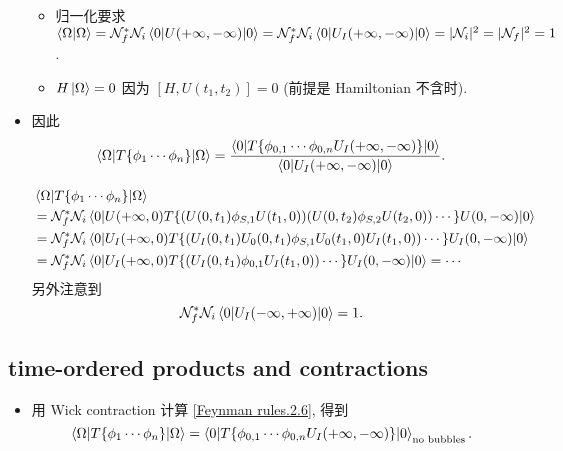 \begin{itemize}
	\begin{itemize}
		\item 归一化要求 $\braket{\Omega | \Omega} = \mathcal{N}^*_f \mathcal{N}_i \braket{0 | U(+ \infty, - \infty) | 0} = \mathcal{N}^*_f \mathcal{N}_i \braket{0 | U_I(+ \infty, - \infty) | 0} = |\mathcal{N}_i|^2 = |\mathcal{N}_f|^2 = 1$.
		
		\item $H \ket{\Omega} = 0$ 因为 $[H, U(t_1, t_2)] = 0$ (前提是 Hamiltonian 不含时).
	\end{itemize}
	
	\item 因此
	\begin{equation} \label{Feynman rules.2.6}
		\braket{\Omega | T\{\phi_1 \cdots \phi_n\} | \Omega} = \frac{\braket{0 | T\{\phi_{0, 1} \cdots \phi_{0, n} U_I(+ \infty, - \infty)\} | 0}}{\braket{0 | U_I(+ \infty, - \infty) | 0}}.
	\end{equation}
	
	\begin{tcolorbox}[title=calculation:]
		\begin{align}
			& \braket{\Omega | T\{\phi_1 \cdots \phi_n\} | \Omega} \notag \\
			&= \mathcal{N}^*_f \mathcal{N}_i \braket{0 | U(+ \infty, 0) T\{(U(0, t_1) \phi_{S, 1} U(t_1, 0)) (U(0, t_2) \phi_{S, 2} U(t_2, 0)) \cdots\} U(0, - \infty) | 0} \notag \\
			&= \mathcal{N}^*_f \mathcal{N}_i \braket{0 | U_I(+ \infty, 0) T\{(U_I(0, t_1) U_0(0, t_1) \phi_{S, 1} U_0(t_1, 0) U_I(t_1, 0)) \cdots\} U_I(0, - \infty) | 0} \notag \\
			&= \mathcal{N}^*_f \mathcal{N}_i \braket{0 | U_I(+ \infty, 0) T\{(U_I(0, t_1) \phi_{0, 1} U_I(t_1, 0)) \cdots\} U_I(0, - \infty) | 0} = \cdots
		\end{align}
		另外注意到
		\begin{equation}
			\mathcal{N}^*_f \mathcal{N}_i \braket{0 | U_I(- \infty, + \infty) | 0} = 1.
		\end{equation}
	\end{tcolorbox}
\end{itemize}

\subsection{time-ordered products and contractions}
\begin{itemize}
	\item 用 Wick contraction 计算 \eqref{Feynman rules.2.6}, 得到
	\begin{equation}
		\braket{\Omega | T\{\phi_1 \cdots \phi_n\} | \Omega} = \braket{0 | T\{\phi_{0, 1} \cdots \phi_{0, n} U_I(+ \infty, - \infty)\} | 0}_\text{no bubbles}.
	\end{equation}
\end{itemize}

